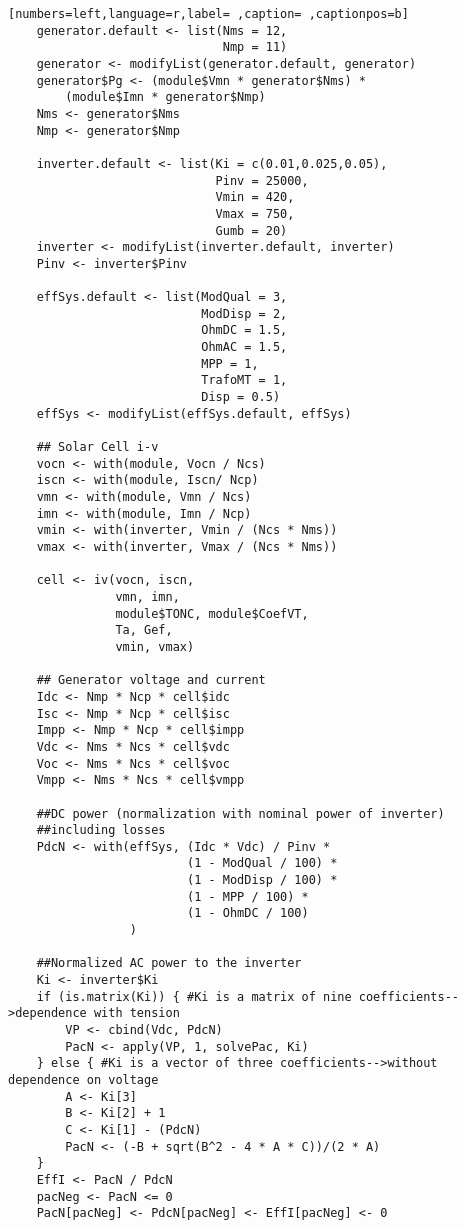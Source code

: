 \begin{lstlisting}[numbers=left,language=r,label= ,caption= ,captionpos=b]
    generator.default <- list(Nms = 12,
                              Nmp = 11)
    generator <- modifyList(generator.default, generator)
    generator$Pg <- (module$Vmn * generator$Nms) *
        (module$Imn * generator$Nmp)
    Nms <- generator$Nms
    Nmp <- generator$Nmp

    inverter.default <- list(Ki = c(0.01,0.025,0.05),
                             Pinv = 25000,
                             Vmin = 420,
                             Vmax = 750,
                             Gumb = 20)
    inverter <- modifyList(inverter.default, inverter)
    Pinv <- inverter$Pinv

    effSys.default <- list(ModQual = 3,
                           ModDisp = 2,
                           OhmDC = 1.5,
                           OhmAC = 1.5,
                           MPP = 1,
                           TrafoMT = 1,
                           Disp = 0.5)
    effSys <- modifyList(effSys.default, effSys)

    ## Solar Cell i-v
    vocn <- with(module, Vocn / Ncs)
    iscn <- with(module, Iscn/ Ncp)
    vmn <- with(module, Vmn / Ncs)
    imn <- with(module, Imn / Ncp)
    vmin <- with(inverter, Vmin / (Ncs * Nms))
    vmax <- with(inverter, Vmax / (Ncs * Nms))

    cell <- iv(vocn, iscn,
               vmn, imn,
               module$TONC, module$CoefVT,
               Ta, Gef,
               vmin, vmax)

    ## Generator voltage and current
    Idc <- Nmp * Ncp * cell$idc
    Isc <- Nmp * Ncp * cell$isc
    Impp <- Nmp * Ncp * cell$impp
    Vdc <- Nms * Ncs * cell$vdc
    Voc <- Nms * Ncs * cell$voc
    Vmpp <- Nms * Ncs * cell$vmpp

    ##DC power (normalization with nominal power of inverter)
    ##including losses
    PdcN <- with(effSys, (Idc * Vdc) / Pinv *
                         (1 - ModQual / 100) *
                         (1 - ModDisp / 100) *
                         (1 - MPP / 100) *
                         (1 - OhmDC / 100)
                 ) 

    ##Normalized AC power to the inverter
    Ki <- inverter$Ki
    if (is.matrix(Ki)) { #Ki is a matrix of nine coefficients-->dependence with tension
        VP <- cbind(Vdc, PdcN)
        PacN <- apply(VP, 1, solvePac, Ki)
    } else { #Ki is a vector of three coefficients-->without dependence on voltage
        A <- Ki[3]
        B <- Ki[2] + 1
        C <- Ki[1] - (PdcN)
        PacN <- (-B + sqrt(B^2 - 4 * A * C))/(2 * A)
    }
    EffI <- PacN / PdcN
    pacNeg <- PacN <= 0
    PacN[pacNeg] <- PdcN[pacNeg] <- EffI[pacNeg] <- 0



\end{lstlisting}
